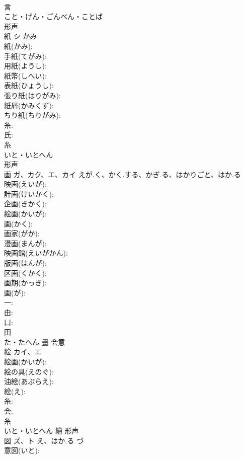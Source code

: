 \documentclass[8pt]{extreport}
\begin{document}
\begin{CJK}{UTF8}{min}
\\	言	
\\	こと・げん・ごんべん・ことば	
\\	形声 
\\	紙	シ	かみ		
\\	紙(かみ): 
\\	手紙(てがみ): 
\\	用紙(ようし): 
\\	紙幣(しへい): 
\\	表紙(ひょうし): 
\\	張り紙(はりがみ): 
\\	紙屑(かみくず): 
\\	ちり紙(ちりがみ): 
\\	糸: 
\\	氏: 
\\	糸	
\\	いと・いとへん	
\\	形声 
\\	画	ガ、カク、エ、カイ	えが.く、かく.する、かぎ.る、はかりごと、はか.る		
\\	映画(えいが): 
\\	計画(けいかく): 
\\	企画(きかく): 
\\	絵画(かいが): 
\\	画(かく): 
\\	画家(がか): 
\\	漫画(まんが): 
\\	映画館(えいがかん): 
\\	版画(はんが): 
\\	区画(くかく): 
\\	画期(かっき): 
\\	画(が): 
\\	一: 
\\	由: 
\\	凵: 
\\	田	
\\	た・たへん	畫	会意 
\\	絵	カイ、エ			
\\	絵画(かいが): 
\\	絵の具(えのぐ): 
\\	油絵(あぶらえ): 
\\	絵(え): 
\\	糸: 
\\	会: 
\\	糸	
\\	いと・いとへん	繪	形声 
\\	図	ズ、ト	え、はか.る	づ	
\\	意図(いと): 

\end{CJK}
\end{document}

